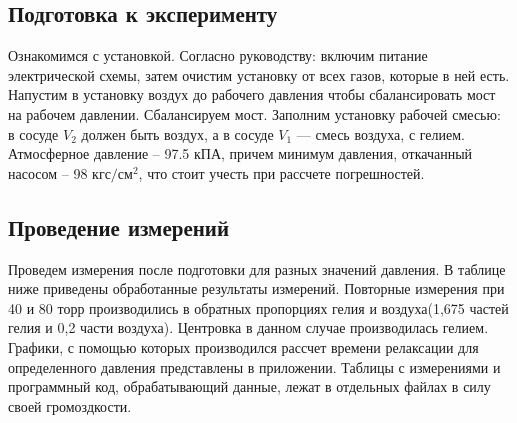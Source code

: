 \subsection{Подготовка к эксперименту}
Ознакомимся с установкой. Согласно руководству:  включим питание электрической схемы, затем очистим установку от всех газов, которые в ней есть. Напустим в установку воздух до рабочего давления чтобы сбалансировать мост на рабочем давлении. Сбалансируем мост. Заполним установку рабочей смесью: в сосуде $V_2$ должен быть воздух, а в сосуде $V_1$ — смесь воздуха, с гелием.\\
Атмосферное давление -- 97.5 кПА, причем минимум давления, откачанный насосом -- 98 $кгс/см^2$, что стоит учесть при рассчете погрешностей. 
\subsection{Проведение измерений}
Проведем измерения после подготовки для разных значений давления. В таблице ниже приведены обработанные результаты измерений. Повторные измерения при 40 и 80 торр производились в обратных пропорциях гелия и воздуха(1,675 частей гелия и 0,2 части воздуха). Центровка в данном случае производилась гелием. Графики, с помощью которых производился рассчет времени релаксации для определенного давления представлены в приложении. Таблицы с измерениями и программный код, обрабатывающий данные, лежат в отдельных файлах в силу своей громоздкости. 

